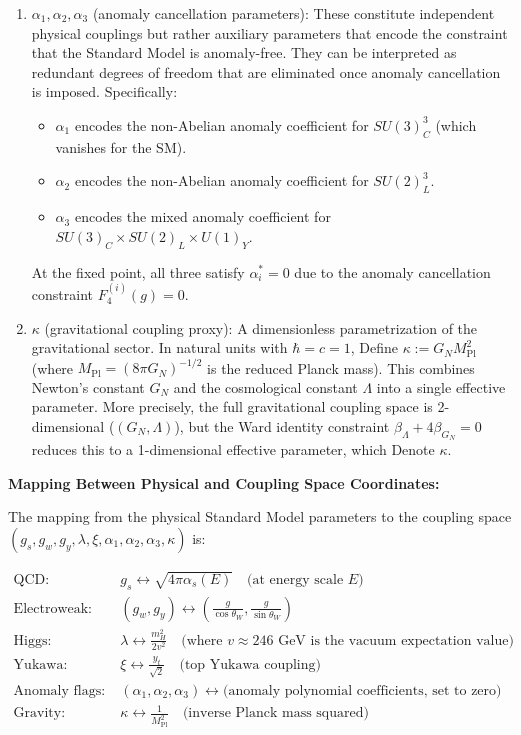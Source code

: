 \begin{lemma}
\begin{enumerate}
\item $\alpha_1, \alpha_2, \alpha_3$ (anomaly cancellation parameters): These constitute independent physical couplings but rather auxiliary parameters that encode the constraint that the Standard Model is anomaly-free. They can be interpreted as redundant degrees of freedom that are eliminated once anomaly cancellation is imposed. Specifically:
\begin{itemize}
\item $\alpha_1$ encodes the non-Abelian anomaly coefficient for $SU(3)_C^3$ (which vanishes for the SM).
\item $\alpha_2$ encodes the non-Abelian anomaly coefficient for $SU(2)_L^3$.
\item $\alpha_3$ encodes the mixed anomaly coefficient for $SU(3)_C \times SU(2)_L \times U(1)_Y$.
\end{itemize}
At the fixed point, all three satisfy $\alpha_i^* = 0$ due to the anomaly cancellation constraint $F_4^{(i)}(g) = 0$.

\item $\kappa$ (gravitational coupling proxy): A dimensionless parametrization of the gravitational sector. In natural units with $\hbar = c = 1$, Define $\kappa := G_N M_{\text{Pl}}^2$ (where $M_{\text{Pl}} = (8\pi G_N)^{-1/2}$ is the reduced Planck mass). This combines Newton's constant $G_N$ and the cosmological constant $\Lambda$ into a single effective parameter. More precisely, the full gravitational coupling space is 2-dimensional ($(G_N, \Lambda)$), but the Ward identity constraint $\beta_\Lambda + 4\beta_{G_N} = 0$ reduces this to a 1-dimensional effective parameter, which Denote $\kappa$.

\end{enumerate}

\textbf{Mapping Between Physical and Coupling Space Coordinates:}

The mapping from the physical Standard Model parameters to the coupling space $(g_s, g_w, g_y, \lambda, \xi, \alpha_1, \alpha_2, \alpha_3, \kappa)$ is:

\begin{align}
\text{QCD: } & g_s \longleftrightarrow \sqrt{4\pi \alpha_s(E)} \quad \text{(at energy scale } E \text{)} \\
\text{Electroweak: } & (g_w, g_y) \longleftrightarrow \left(\frac{g}{\cos\theta_W}, \frac{g}{\sin\theta_W} \right) \\
\text{Higgs: } & \lambda \longleftrightarrow \frac{m_H^2}{2v^2} \quad \text{(where } v \approx 246 \text{ GeV is the vacuum expectation value)} \\
\text{Yukawa: } & \xi \longleftrightarrow \frac{y_t}{\sqrt{2}} \quad \text{(top Yukawa coupling)} \\
\text{Anomaly flags: } & (\alpha_1, \alpha_2, \alpha_3) \longleftrightarrow \text{(anomaly polynomial coefficients, set to zero)} \\
\text{Gravity: } & \kappa \longleftrightarrow \frac{1}{M_{\text{Pl}}^2} \quad \text{(inverse Planck mass squared)}
\end{align}


\end{lemma}

